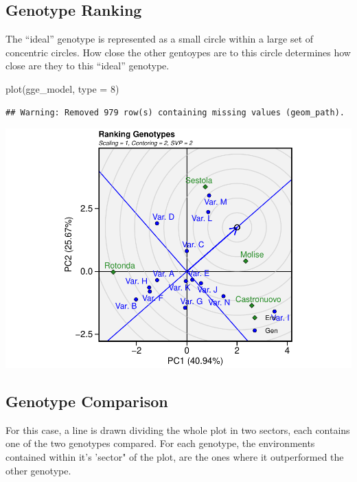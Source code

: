 \documentclass[
]{book}
\newenvironment{Shaded}{\begin{snugshade}}{\end{snugshade}}
\newcommand{\AttributeTok}[1]{\textcolor[rgb]{0.77,0.63,0.00}{#1}}
\newcommand{\DecValTok}[1]{\textcolor[rgb]{0.00,0.00,0.81}{#1}}
\newcommand{\FunctionTok}[1]{\textcolor[rgb]{0.00,0.00,0.00}{#1}}
\newcommand{\NormalTok}[1]{#1}
\begin{document}
\hypertarget{genotype-ranking}{%
\subsection{Genotype Ranking}\label{genotype-ranking}}

The ``ideal'' genotype is represented as a small circle within a large set of concentric circles. How close the other gentoypes are to this circle determines how close are they to this ``ideal'' genotype.

\begin{Shaded}
\begin{Highlighting}[]
\FunctionTok{plot}\NormalTok{(gge\_model, }\AttributeTok{type =} \DecValTok{8}\NormalTok{)}
\end{Highlighting}
\end{Shaded}

\begin{verbatim}
## Warning: Removed 979 row(s) containing missing values (geom_path).
\end{verbatim}

\includegraphics{PPB-Toolkit-for-R-and-R-Studio_files/figure-latex/unnamed-chunk-129-1.pdf}

\hypertarget{genotype-comparison}{%
\subsection{Genotype Comparison}\label{genotype-comparison}}

For this case, a line is drawn dividing the whole plot in two sectors, each contains one of the two genotypes compared. For each genotype, the environments contained within it's 'sector" of the plot, are the ones where it outperformed the other genotype.
\end{document}
